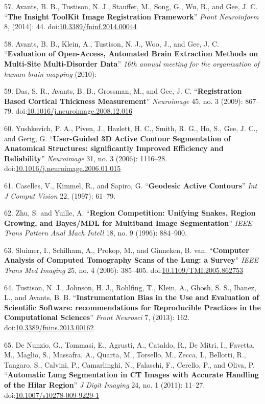 \documentclass[11pt,]{article}
\begin{document}
57. Avants, B. B., Tustison, N. J., Stauffer, M., Song, G., Wu, B., and
Gee, J. C. ``\textbf{The Insight ToolKit Image Registration Framework}''
\emph{Front Neuroinform} 8, (2014): 44.
doi:\href{http://dx.doi.org/10.3389/fninf.2014.00044}{10.3389/fninf.2014.00044}

58. Avants, B. B., Klein, A., Tustison, N. J., Woo, J., and Gee, J. C.
``\textbf{Evaluation of Open-Access, Automated Brain Extraction Methods
on Multi-Site Multi-Disorder Data}'' \emph{16th annual meeting for the
organization of human brain mapping} (2010):

59. Das, S. R., Avants, B. B., Grossman, M., and Gee, J. C.
``\textbf{Registration Based Cortical Thickness Measurement}''
\emph{Neuroimage} 45, no. 3 (2009): 867--79.
doi:\href{http://dx.doi.org/10.1016/j.neuroimage.2008.12.016}{10.1016/j.neuroimage.2008.12.016}

60. Yushkevich, P. A., Piven, J., Hazlett, H. C., Smith, R. G., Ho, S.,
Gee, J. C., and Gerig, G. ``\textbf{User-Guided 3D Active Contour
Segmentation of Anatomical Structures: significantly Improved Efficiency
and Reliability}'' \emph{Neuroimage} 31, no. 3 (2006): 1116--28.
doi:\href{http://dx.doi.org/10.1016/j.neuroimage.2006.01.015}{10.1016/j.neuroimage.2006.01.015}

61. Caselles, V., Kimmel, R., and Sapiro, G. ``\textbf{Geodesic Active
Contours}'' \emph{Int J Comput Vision} 22, (1997): 61--79.

62. Zhu, S. and Yuille, A. ``\textbf{Region Competition: Unifying
Snakes, Region Growing, and Bayes/MDL for Multiband Image
Segmentation}'' \emph{IEEE Trans Pattern Anal Mach Intell} 18, no. 9
(1996): 884--900.

63. Sluimer, I., Schilham, A., Prokop, M., and Ginneken, B. van.
``\textbf{Computer Analysis of Computed Tomography Scans of the Lung: a
Survey}'' \emph{IEEE Trans Med Imaging} 25, no. 4 (2006): 385--405.
doi:\href{http://dx.doi.org/10.1109/TMI.2005.862753}{10.1109/TMI.2005.862753}

64. Tustison, N. J., Johnson, H. J., Rohlfing, T., Klein, A., Ghosh, S.
S., Ibanez, L., and Avants, B. B. ``\textbf{Instrumentation Bias in the
Use and Evaluation of Scientific Software: recommendations for
Reproducible Practices in the Computational Sciences}'' \emph{Front
Neurosci} 7, (2013): 162.
doi:\href{http://dx.doi.org/10.3389/fnins.2013.00162}{10.3389/fnins.2013.00162}

65. De Nunzio, G., Tommasi, E., Agrusti, A., Cataldo, R., De Mitri, I.,
Favetta, M., Maglio, S., Massafra, A., Quarta, M., Torsello, M., Zecca,
I., Bellotti, R., Tangaro, S., Calvini, P., Camarlinghi, N., Falaschi,
F., Cerello, P., and Oliva, P. ``\textbf{Automatic Lung Segmentation in
CT Images with Accurate Handling of the Hilar Region}'' \emph{J Digit
Imaging} 24, no. 1 (2011): 11--27.
doi:\href{http://dx.doi.org/10.1007/s10278-009-9229-1}{10.1007/s10278-009-9229-1}
\end{document}
